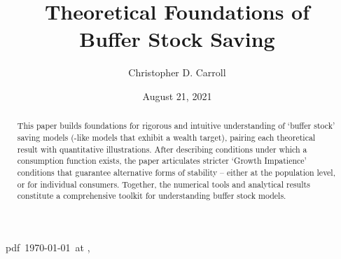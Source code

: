 \documentclass[BufferStockTheory]{subfiles}
\begin{document}
\providecommand{\versn}{pdf} %
\ifthenelse{\boolean{Web}}{    %
  \renewcommand{\versn}{Web}     %
  \renewcommand{\rootFromOut}{.} %
}{}  %

\hfill{\tiny \jobname~\versn~\today~{at} \DTMcurrenttime, ~~}

\title{Theoretical Foundations of \\ Buffer Stock Saving}

\author{Christopher D. Carroll\authNum}



\renewcommand{\forcedate}{August 21, 2021}\date{\forcedate} %


\maketitle 
\hypertarget{abstract}{}
\begin{abstract}
  This paper builds foundations for rigorous and intuitive understanding of `buffer stock' saving models (\cite{bewleyPIH}-like models that exhibit a wealth target), pairing each theoretical result with quantitative illustrations.  After describing conditions under which a consumption function exists, the paper articulates stricter `Growth Impatience' conditions that guarantee alternative forms of stability -- either at the population level, or for individual consumers.  Together, the numerical tools and analytical results constitute a comprehensive toolkit for understanding buffer stock models. 
\end{abstract}
\end{document}

